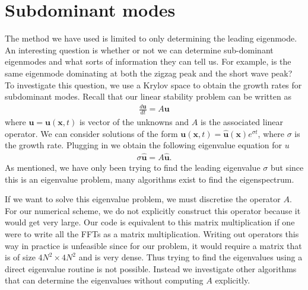 \section{Subdominant modes}
The method we have used is limited to only determining the leading eigenmode. An interesting question is whether or not we can determine sub-dominant eigenmodes and what sorts of information they can tell us. For example, is the same eigenmode dominating at both the zigzag peak and the short wave peak? To investigate this question, we use a Krylov space to obtain the growth rates for subdominant modes. Recall that our linear stability problem can be written as 
\begin{align}
\frac{d\bm{u}}{dt} = A\bm{u}
\end{align}
where $\bm{u}=\bm{u}(\bm{x},t)$ is vector of the unknowns and $A$ is the associated linear operator. We can consider solutions of the form $\bm{u}(\bm{x},t)=\hat{\bm{u}}(\bm{x})e^{\sigma t}$, where $\sigma$ is the growth rate. Plugging in we obtain the following eigenvalue equation for $u$
\begin{align}
\sigma \hat{\bm{u}} = A\hat{\bm{u}}.
\end{align}
As mentioned, we have only been trying to find the leading eigenvalue $\sigma$ but since this is an eigenvalue problem, many algorithms exist to find the eigenspectrum. 

If we want to solve this eigenvalue problem, we must discretise the operator $A$. For our numerical scheme, we do not explicitly construct this operator because it would get very large. Our code is equivalent to this matrix multiplication if one were to write all the FFTs as a matrix multiplication. Writing out operators this way in practice is unfeasible since for our problem, it would require a matrix that is of size $4N^{2}\times 4N^{2}$ and is very dense. Thus trying to find the eigenvalues using a direct eigenvalue routine is not possible. Instead we investigate other algorithms that can determine the eigenvalues without computing $A$ explicitly. 

